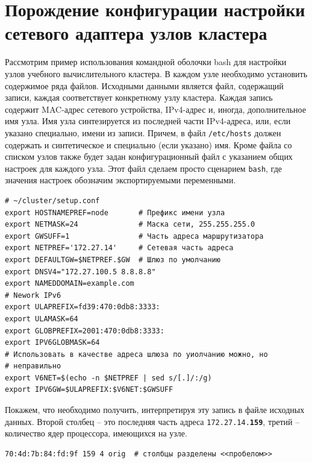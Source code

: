 \documentclass[a4paper,12pt,final,openany]{extbook}
\begin{document}
\section{Порождение конфигурации настройки сетевого адаптера узлов кластера}

Рассмотрим пример использования командной оболочки bash для настройки узлов учебного вычислительного кластера. В каждом узле необходимо установить содержимое ряда файлов. Исходными данными является файл, содержащий записи, каждая соответствует конкретному узлу кластера. Каждая запись содержит MAC-адрес сетевого устройства, IPv4-адрес и, иногда, дополнительное имя узла. Имя узла синтезируется из последней части IPv4-адреса, или, если указано специально, имени из записи. Причем, в файл \texttt{/etc/hosts} должен содержать и синтетическое и специально (если указано) имя. Кроме файла со списком узлов также будет задан конфигурационный файл с указанием общих настроек для каждого узла. Этот файл сделаем просто сценарием \texttt{bash}, где значения настроек обозначим экспортируемыми переменными.

\label{conforig}
\begin{verbatim}
# ~/cluster/setup.conf
export HOSTNAMEPREF=node       # Префикс имени узла
export NETMASK=24              # Маска сети, 255.255.255.0
export GWSUFF=1                # Часть адреса маршрутизатора
export NETPREF='172.27.14'     # Сетевая часть адреса
export DEFAULTGW=$NETPREF.$GW  # Шлюз по умолчанию
export DNSV4="172.27.100.5 8.8.8.8"
export NAMEDDOMAIN=example.com
# Nework IPv6
export ULAPREFIX=fd39:470:0db8:3333:
export ULAMASK=64
export GLOBPREFIX=2001:470:0db8:3333:
export IPV6GLOBMASK=64
# Использовать в качестве адреса шлюза по уиолчанию можно, но
# неправильно
export V6NET=$(echo -n $NETPREF | sed s/[.]/:/g)
export IPV6GW=$ULAPREFIX:$V6NET:$GWSUFF
\end{verbatim}

Покажем, что необходимо получить, интерпретируя эту запись в файле исходных данных. Второй столбец -- это последняя часть адреса \texttt{172.27.14.\textbf{159}}, третий -- количество ядер процессора, имеющихся на узле.
\begin{verbatim}
70:4d:7b:84:fd:9f 159 4 orig  # столбцы разделены <<пробелом>>
\end{verbatim}
\end{document}
